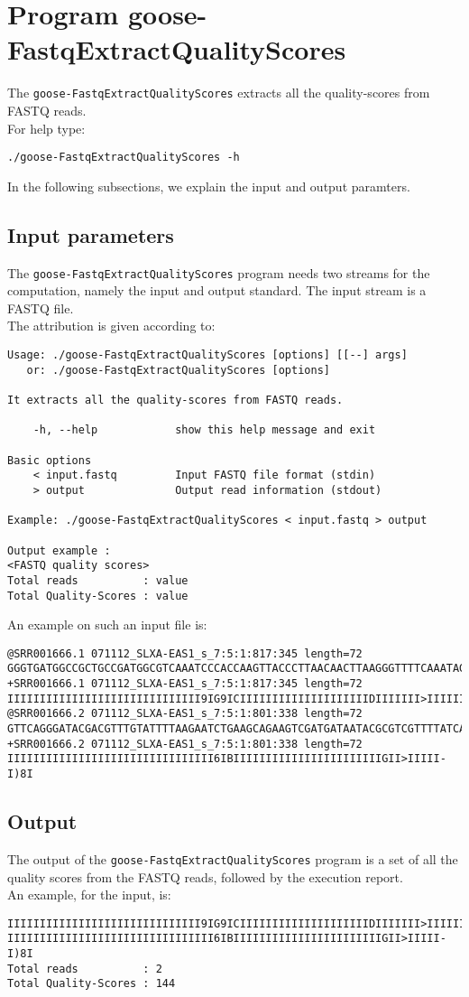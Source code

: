 \section{Program goose-FastqExtractQualityScores}
The \texttt{goose-FastqExtractQualityScores} extracts all the quality-scores from FASTQ reads.\\
For help type:
\begin{lstlisting}
./goose-FastqExtractQualityScores -h
\end{lstlisting}
In the following subsections, we explain the input and output paramters.

\subsection*{Input parameters}

The \texttt{goose-FastqExtractQualityScores} program needs two streams for the computation,
namely the input and output standard. The input stream is a FASTQ file.\\
The attribution is given according to:
\begin{lstlisting}
Usage: ./goose-FastqExtractQualityScores [options] [[--] args]
   or: ./goose-FastqExtractQualityScores [options]

It extracts all the quality-scores from FASTQ reads.

    -h, --help            show this help message and exit

Basic options
    < input.fastq         Input FASTQ file format (stdin)
    > output              Output read information (stdout)

Example: ./goose-FastqExtractQualityScores < input.fastq > output

Output example :
<FASTQ quality scores>
Total reads          : value
Total Quality-Scores : value
\end{lstlisting}
An example on such an input file is:
\begin{lstlisting}
@SRR001666.1 071112_SLXA-EAS1_s_7:5:1:817:345 length=72
GGGTGATGGCCGCTGCCGATGGCGTCAAATCCCACCAAGTTACCCTTAACAACTTAAGGGTTTTCAAATAGA
+SRR001666.1 071112_SLXA-EAS1_s_7:5:1:817:345 length=72
IIIIIIIIIIIIIIIIIIIIIIIIIIIIII9IG9ICIIIIIIIIIIIIIIIIIIIIDIIIIIII>IIIIII/
@SRR001666.2 071112_SLXA-EAS1_s_7:5:1:801:338 length=72
GTTCAGGGATACGACGTTTGTATTTTAAGAATCTGAAGCAGAAGTCGATGATAATACGCGTCGTTTTATCAT
+SRR001666.2 071112_SLXA-EAS1_s_7:5:1:801:338 length=72
IIIIIIIIIIIIIIIIIIIIIIIIIIIIIIII6IBIIIIIIIIIIIIIIIIIIIIIIIGII>IIIII-I)8I
\end{lstlisting}

\subsection*{Output}
The output of the \texttt{goose-FastqExtractQualityScores} program is a set of all the quality scores from the FASTQ reads, followed by the execution report.\\
An example, for the input, is:
\begin{lstlisting}
IIIIIIIIIIIIIIIIIIIIIIIIIIIIII9IG9ICIIIIIIIIIIIIIIIIIIIIDIIIIIII>IIIIII/
IIIIIIIIIIIIIIIIIIIIIIIIIIIIIIII6IBIIIIIIIIIIIIIIIIIIIIIIIGII>IIIII-I)8I
Total reads          : 2
Total Quality-Scores : 144
\end{lstlisting}
